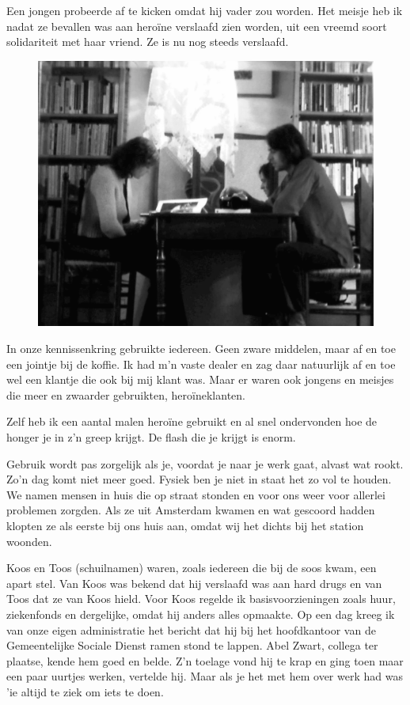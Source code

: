 \documentclass[12pt,twoside, openright]{memoir}
\begin{document}
Een jongen probeerde af te kicken omdat hij vader zou worden. Het meisje heb ik nadat ze bevallen was aan heroïne verslaafd zien worden, uit een vreemd soort solidariteit met haar vriend. Ze is nu nog steeds verslaafd. 

\begin{figure}
\centering
\includegraphics[width=\textwidth]{img/256tafel}
\end{figure}

In onze kennissenkring gebruikte iedereen. Geen zware middelen, maar af en toe een jointje bij de koffie. Ik had m’n vaste dealer en zag daar natuurlijk af en toe wel een klantje die ook bij mij klant was. Maar er waren ook jongens en meisjes die meer en zwaarder gebruikten, heroïneklanten. 

Zelf heb ik een aantal malen heroïne gebruikt en al snel ondervonden hoe de honger je in z’n greep krijgt. De flash die je krijgt is enorm.

Gebruik wordt pas zorgelijk als je, voordat je naar je werk gaat, alvast wat rookt. Zo’n dag komt niet meer goed. Fysiek ben je niet in staat het zo vol te houden. We namen mensen in huis die op straat stonden en voor ons weer voor allerlei problemen zorgden. Als ze uit Amsterdam kwamen en wat gescoord hadden klopten ze als eerste bij ons huis aan, omdat wij het dichts bij het station woonden. 
\newpage

Koos en Toos (schuilnamen) waren, zoals iedereen die bij de soos kwam, een apart stel. Van Koos was bekend dat hij verslaafd was aan hard drugs en van Toos dat ze van Koos hield. Voor Koos regelde ik basisvoorzieningen zoals huur, ziekenfonds en dergelijke, omdat hij anders alles opmaakte. Op een dag kreeg ik van onze eigen administratie het bericht dat hij bij het hoofdkantoor van de Gemeentelijke Sociale Dienst ramen stond te lappen. Abel Zwart, collega ter plaatse, kende hem goed en belde. Z’n toelage vond hij te krap en ging toen maar een paar uurtjes werken, vertelde hij. Maar als je het met hem over werk had was 'ie altijd te ziek om iets te doen. 
\end{document}
